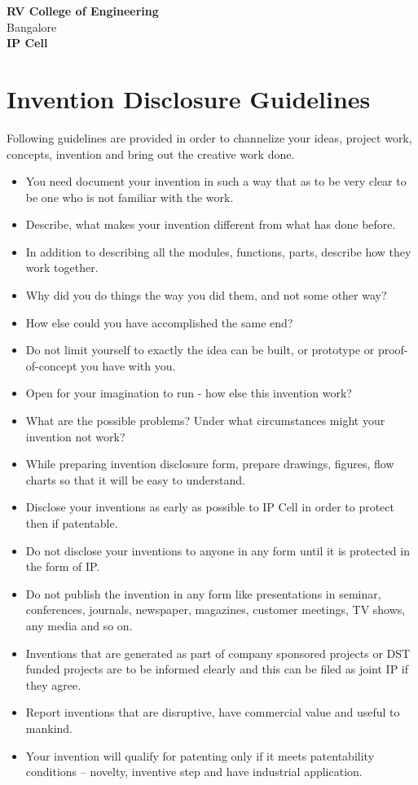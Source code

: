 \documentclass[a4paper,12pt]{article}
\begin{document}
\begin{center}
    \textbf{\Large RV College of Engineering} \\
    Bangalore \\
    \textbf{IP Cell}
\end{center}

\vspace{0.5cm}

\section*{Invention Disclosure Guidelines}

Following guidelines are provided in order to channelize your ideas, project work, concepts, invention and bring out the creative work done.

\begin{itemize}[itemsep=0.5em]
    \item You need document your invention in such a way that as to be very clear to be one who is not familiar with the work.
    \item Describe, what makes your invention different from what has done before.
    \item In addition to describing all the modules, functions, parts, describe how they work together.
    \item Why did you do things the way you did them, and not some other way?
    \item How else could you have accomplished the same end?
    \item Do not limit yourself to exactly the idea can be built, or prototype or proof-of-concept you have with you.
    \item Open for your imagination to run - how else this invention work?
    \item What are the possible problems? Under what circumstances might your invention not work?
    \item While preparing invention disclosure form, prepare drawings, figures, flow charts so that it will be easy to understand.
    \item Disclose your inventions as early as possible to IP Cell in order to protect then if patentable.
    \item Do not disclose your inventions to anyone in any form until it is protected in the form of IP.
    \item Do not publish the invention in any form like presentations in seminar, conferences, journals, newspaper, magazines, customer meetings, TV shows, any media and so on.
    \item Inventions that are generated as part of company sponsored projects or DST funded projects are to be informed clearly and this can be filed as joint IP if they agree.
    \item Report inventions that are disruptive, have commercial value and useful to mankind.
    \item Your invention will qualify for patenting only if it meets patentability conditions – novelty, inventive step and have industrial application.
\end{itemize}
\end{document}
